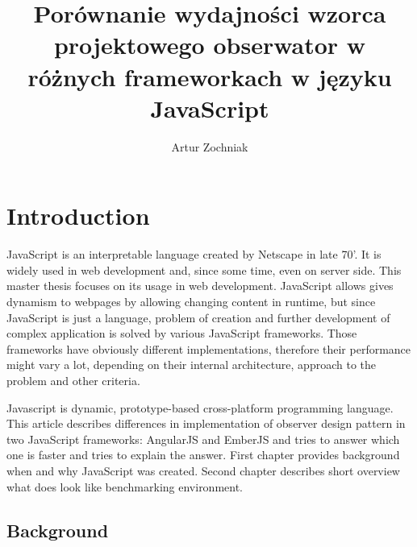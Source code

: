 \documentclass[inzynier,druk,ramka]{build/dyplom}
\author{Artur Zochniak}
\title{Porównanie wydajności wzorca projektowego obserwator w różnych frameworkach w języku JavaScript}
\begin{document}
\maketitle




% 



\chapter{Introduction}
JavaScript is an interpretable language created by Netscape in late 70’. It is widely used in web development and, since some time, even on server side. This master thesis focuses on its usage in web development. JavaScript allows gives dynamism to webpages by allowing changing content in runtime, but since JavaScript is just a language, problem of creation and further development of complex application is solved by various JavaScript frameworks. Those frameworks have obviously different implementations, therefore their performance might vary a lot, depending on their internal architecture, approach to the problem and other criteria.

Javascript is dynamic, prototype-based cross-platform programming language.
This article describes differences in implementation of observer design pattern in two JavaScript frameworks: AngularJS and EmberJS and tries to answer which one is faster and tries to explain the answer.
First chapter provides background when and why JavaScript was created.
Second chapter describes short overview what does look like benchmarking environment.

\section{Background}
\end{document}
